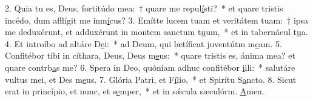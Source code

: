 2. Quia tu es, Deus, fortitúdo mea:~† quare me repul\uline{í}sti?~* et quare tristis incédo, dum afflígit me inm\uline{í}cus?
3. Emítte lucem tuam et veritátem tuam:~† ipsa me deduxérunt, et adduxérunt in montem sanctum t\uline{u}um,~* et in tabernácul t\uline{u}a.
4. Et introíbo ad altáre D\uline{e}i:~* ad Deum, qui lætíficat juventútm m\uline{e}am.
5. Confitébor tibi in cíthara, Deus, Deus m\uline{e}us:~* quare tristis es, ánima mea? et quare contrb\uline{a}s me?
6. Spera in Deo, quóniam adhuc confitébor \uline{i}lli:~* salutáre vultus mei, et Des m\uline{e}us.
7. Glória Patri, et F\uline{í}lio,~* et Spirítu S\uline{a}ncto.
8. Sicut erat in princípio, et nunc, et s\uline{e}mper,~* et in sǽcula sæculórm. \uline{A}men.

